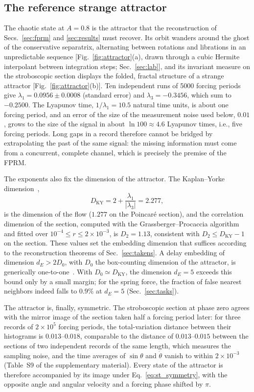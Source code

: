 \subsection{The reference strange attractor}\label{sec:attractor}

The chaotic state at $A=0.8$ is the attractor that the reconstruction of Secs.~\ref{sec:fprm} and \ref{sec:results} must recover. Its orbit wanders around the ghost of the conservative separatrix, alternating between rotations and librations in an unpredictable sequence [Fig.~\ref{fig:attractor}(a), drawn through a cubic Hermite interpolant between integration steps; Sec.~\ref{sec:lab}], and its invariant measure on the stroboscopic section displays the folded, fractal structure of a strange attractor [Fig.~\ref{fig:attractor}(b)]. Ten independent runs of 5000 forcing periods give $\lambda_1=0.0956\pm0.0008$ (standard error) and $\lambda_3=-0.3456$, which sum to $-0.2500$. The Lyapunov time, $1/\lambda_1=10.5$ natural time units, is about one forcing period, and an error of the size of the measurement noise used below, $0.01$, grows to the size of the signal in about $\ln100\approx4.6$ Lyapunov times, i.e., five forcing periods. Long gaps in a record therefore cannot be bridged by extrapolating the past of the same signal: the missing information must come from a concurrent, complete channel, which is precisely the premise of the FPRM.

The exponents also fix the dimension of the attractor. The Kaplan--Yorke dimension~\cite{KaplanYorke1979},
\begin{equation}
D_{\mathrm{KY}} = 2 + \frac{\lambda_1}{|\lambda_3|} = 2.277 ,
\label{eq:dky}
\end{equation}
is the dimension of the flow ($1.277$ on the Poincar\'e section), and the correlation dimension of the section, computed with the Grassberger--Procaccia algorithm~\cite{Grassberger1983} and fitted over $10^{-4}\le r\le2\times10^{-3}$, is $D_2=1.13$, consistent with $D_2\le D_{\mathrm{KY}}-1$ on the section. These values set the embedding dimension that suffices according to the reconstruction theorems of Sec.~\ref{sec:takens}. A delay embedding of dimension $d_E>2D_0$, with $D_0$ the box-counting dimension of the attractor, is generically one-to-one~\cite{Sauer1991}. With $D_0\simeq D_{\mathrm{KY}}$, the dimension $d_E=5$ exceeds this bound only by a small margin; for the spring force, the fraction of false nearest neighbors indeed falls to $0.9\%$ at $d_E=5$ (Sec.~\ref{sec:tasks}).

The attractor is, finally, symmetric. The stroboscopic section at phase zero agrees with the mirror image of the section taken half a forcing period later: for three records of $2\times10^{5}$ forcing periods, the total-variation distance between their histograms is $0.013$--$0.018$, comparable to the distance of $0.013$--$0.015$ between the sections of two independent records of the same length, which measures the sampling noise, and the time averages of $\sin\theta$ and $\dot\theta$ vanish to within $2\times10^{-3}$ (Table~S9 of the supplementary material). Every state of the attractor is therefore accompanied by its image under Eq.~\eqref{eq:st_symmetry}, with the opposite angle and angular velocity and a forcing phase shifted by $\pi$.

